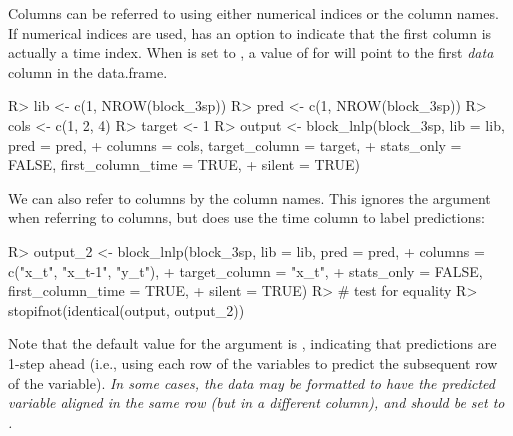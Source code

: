 \documentclass[article]{jss}
\begin{document}
Columns can be referred to using either numerical indices or the column names. If numerical indices are used,  has an option to indicate that the first column is actually a time index. When  is set to , a value of  for  will point to the first \emph{data} column in the data.frame.

\begin{Schunk}
\begin{Sinput}
R> lib <- c(1, NROW(block_3sp))
R> pred <- c(1, NROW(block_3sp))
R> cols <- c(1, 2, 4)
R> target <- 1
R> output <- block_lnlp(block_3sp, lib = lib, pred = pred,
+                       columns = cols, target_column = target,
+                       stats_only = FALSE, first_column_time = TRUE, 
+                       silent = TRUE)
\end{Sinput}
\end{Schunk}

We can also refer to columns by the column names. This ignores the  argument when referring to columns, but does use the time column to label predictions:

\begin{Schunk}
\begin{Sinput}
R> output_2 <- block_lnlp(block_3sp, lib = lib, pred = pred,
+                         columns = c("x_t", "x_t-1", "y_t"), 
+                         target_column = "x_t",
+                         stats_only = FALSE, first_column_time = TRUE, 
+                         silent = TRUE)
R> # test for equality
R> stopifnot(identical(output, output_2))
\end{Sinput}
\end{Schunk}

Note that the default value for the  argument is , indicating that predictions are 1-step ahead (i.e., using each row of the  variables to predict the subsequent row of the  variable). \emph{In some cases, the data may be formatted to have the predicted variable aligned in the same row (but in a different column), and  should be set to .}
\end{document}
